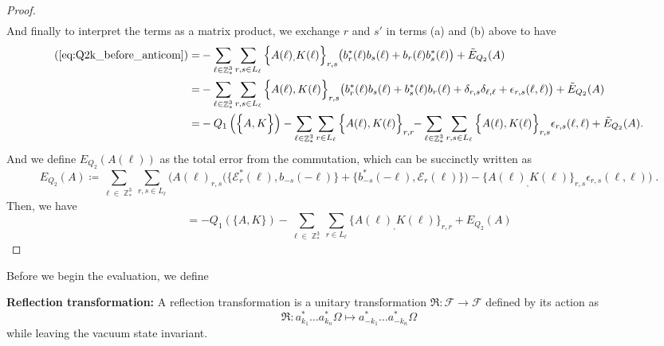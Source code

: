 \documentclass[sn-mathphys, Numbered ,a4paper]{sn-jnl}%
\DeclareMathOperator{\Z}{\mathbb{Z}}
\theoremstyle{plain}
\theoremstyle{definition}
\theoremstyle{remark}
\theoremstyle{plain}
\theoremstyle{definition}
\theoremstyle{remark}
\begin{document}
\begin{proof}
\begin{align}
\end{align}
And finally to interpret the terms as a matrix product, we exchange $r$ and $s'$ in terms (a) and (b) above to have 
\begin{alignat}{2}
    (\ref{eq:Q2k_before_anticom}) = &-\sum\limits_{\ell \in \Z^3_*}\sum\limits_{r,s \in L_{\ell}}\Big\{A(\ell)_
        ,K(\ell)\Big\}_{r,s}\big(b^*_{r}(\ell)b_{s}(\ell)+b_{r}(\ell)b^*_{s}(\ell) \big)\nonumber +\tilde E_{Q_2}(A)\\
        = &-\sum\limits_{\ell \in \Z^3_*}\sum\limits_{r,s \in L_{\ell}}\Big\{A(\ell), K(\ell) \Big\}_{r,s} \big( b^*_{r}(\ell) b_{s}(\ell) + b^*_{s}(\ell) b_{r}(\ell) + \delta_{r,s} \delta_{\ell,\ell} + \epsilon_{r,s}(\ell,\ell) \big) + \tilde E_{Q_2}(A)\\
        =&- Q_1 \left(\Big\{A,K\Big\}\right) - \sum\limits_{\ell \in \Z^3_*} \sum\limits_{r \in L_{\ell}} \Big\{ A(\ell),K(\ell) \Big\}_{r,r}\!\! -\sum\limits_{\ell \in \Z^3_*} \sum\limits_{r,s \in L_{\ell}} \Big\{ A(\ell), K(\ell) \Big\}_{r,s} \epsilon_{r,s}(\ell,\ell)  + \tilde{E}_{Q_2}(A). \label{eq:Q2Kbigerr}
\end{alignat}
And we define $E_{Q_2}(A(\ell))$ as the total error from the commutation, which can be succinctly written as 
\begin{equation}
    E_{Q_2}(A) \coloneq
    \sum\limits_{\ell \in \Z^3_*} \sum\limits_{r,s \in L_{\ell}} \Big( A(\ell)_{r,s} \big( \big\{ \mathcal{E}^*_{r}(\ell), b_{-s}(-\ell) \big\} + \big\{ b^*_{-s}(-\ell) , \mathcal{E}_r(\ell) \big\} \big)-\big\{A(\ell)_,K(\ell) \big\}_{r,s} \epsilon_{r,s}(\ell,\ell) \Big)\;.  
\end{equation}
Then, we have 
\begin{equation}
    [Q_2(A),\mathcal{K}] = -Q_1\left(\Big\{A,K\Big\}\right)-\sum\limits_{\ell \in \Z^3_*} \sum\limits_{r \in L_{\ell}}\Big\{A(\ell)_
        ,K(\ell)\Big\}_{r,r} + E_{Q_2}(A) 
\end{equation}
\end{proof}
Before we begin the evaluation, we define\newline

\textbf{Reflection transformation:} A reflection transformation is a unitary transformation $\mathfrak{R}:\mathcal{F}\rightarrow \mathcal{F}$ defined by its action as
\begin{equation}
    \mathfrak{R}: a^*_{k_1}\ldots a^*_{k_n}\Omega \mapsto a^*_{-k_1}\ldots a^*_{-k_n}\Omega 
\end{equation}
while leaving the vacuum state invariant.\newline
\end{document}
